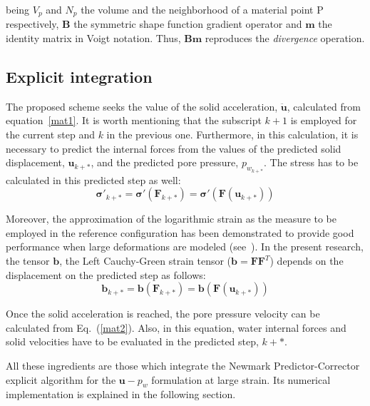 \documentclass[twocolumn]{svjour3}          %
\begin{document}
  being $V_p$ and $N_p$ the volume and the neighborhood of a material point P respectively, $\mathbf{B}$ the symmetric shape function gradient operator and $\mathbf{m}$ the identity matrix in Voigt notation. Thus, $\mathbf{B}\mathbf{m}$ reproduces the \textit{divergence} operation.
  
\subsection{Explicit integration}
\label{subsec:42}
The proposed scheme seeks the value of the solid acceleration, $\ddot{\boldsymbol{u}}$, calculated from equation~\eqref{mat1}. It is worth mentioning that the subscript $k+1$ is employed for the current step and $k$ in the previous one. Furthermore, in this calculation, it is necessary to predict the internal forces from the values of the predicted solid displacement, $\boldsymbol{u}_{k+*}$, and the predicted pore pressure, $p_{w_{k+*}}$. The stress has to be calculated in this predicted step as well:
$$
\boldsymbol{\sigma'}_{k+*}=\boldsymbol{\sigma'}(\boldsymbol{F}_{k+*})=\boldsymbol{\sigma'}(\boldsymbol{F}(\boldsymbol{u}_{k+*}))
$$

Moreover, the approximation of the logarithmic strain as the measure to be employed in the reference configuration has been demonstrated to provide good performance when large deformations are modeled (see~\cite{Gavagnin2020,Borja1997,Borja1998a}). In the present research, the tensor $\mathbf{b}$, the Left Cauchy-Green strain tensor ($\mathbf{b}=\mathbf{F}\mathbf{F}^T$) depends on the displacement on the predicted step as follows:
 $$
 \mathbf{b}_{k+*}=\mathbf{b}(\mathbf{F}_{k+*})=\mathbf{b}(\mathbf{F}(\boldsymbol{u}_{k+*}))
 $$

Once the solid acceleration is reached, the pore pressure velocity can be calculated from Eq.~(\ref{mat2}). Also, in this equation, water internal forces and solid velocities have to be evaluated in the predicted step, $k+*$.

All these ingredients are those which integrate the Newmark Predictor-Corrector explicit algorithm for the $\boldsymbol{u}-p_w$ formulation at large strain. Its numerical implementation is explained in the following section.

\end{document}
